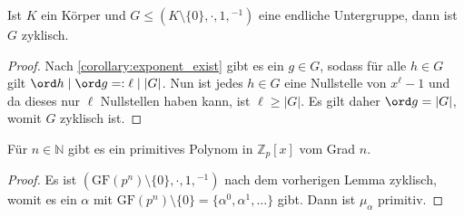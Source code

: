 \begin{lemma}
    Ist $K$ ein Körper und $G \le (K \setminus \{0\}, \cdot, 1, {}^{-1})$ eine endliche Untergruppe, dann ist $G$ zyklisch.
\end{lemma}
\begin{proof}
    Nach \cref{corollary:exponent_exist} gibt es ein $g \in G$, sodass für alle $h \in G$ gilt $\ord h \mid \ord g =: \ell \mid \vert G \vert$. Nun ist jedes $h \in G$ eine Nullstelle von $x^\ell-1$ und da dieses nur $\ell$ Nullstellen haben kann, ist $\ell \geq \vert G\vert$. Es gilt daher $\ord g = \vert G \vert$, womit $G$ zyklisch ist.
\end{proof}

\begin{corollary}
    Für $n \in \mathbb{N}$ gibt es ein primitives Polynom in $\mathbb{Z}_p[x]$ vom Grad $n$.
\end{corollary}
\begin{proof}
    Es ist $(\mathrm{GF}(p^n)\setminus\{0\}, \cdot, 1, {}^{-1})$ nach dem vorherigen Lemma zyklisch, womit es ein $\alpha$ mit $\mathrm{GF}(p^n)\setminus\{0\} = \{\alpha^0, \alpha^1, \ldots\}$ gibt. Dann ist $\mu_\alpha$ primitiv.
\end{proof}

